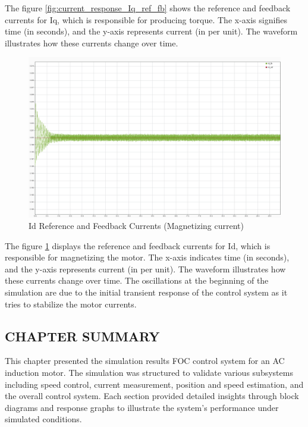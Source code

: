 The figure \ref{fig:current_response_Iq_ref_fb} shows the reference and feedback currents for Iq, which is responsible for producing torque. The x-axis signifies time (in seconds), and the y-axis represents current (in per unit). The waveform illustrates how these currents change over time. 


\begin{figure}[H]
	\centering
	\includegraphics[width=6in]{sections/section3/images/simulationResutls/Id_ref_fb.png}
	\caption{Id Reference and Feedback Currents (Magnetizing current)}
	\label{fig:current_response_Id_ref_fb}
\end{figure}

The figure \ref{fig:current_response_Id_ref_fb}  displays the reference and feedback currents for Id, which is responsible for magnetizing the motor. The x-axis indicates time (in seconds), and the y-axis represents current (in per unit). The waveform illustrates how these currents change over time. The oscillations at the beginning of the simulation are due to the initial transient response of the control system as it tries to stabilize the motor currents.


\subsection{CHAPTER SUMMARY}

This chapter presented the simulation results FOC control system for an AC induction motor. The simulation was structured to validate various subsystems including speed control, current measurement, position and speed estimation, and the overall control system. Each section provided detailed insights through block diagrams and response graphs to illustrate the system's performance under simulated conditions.

